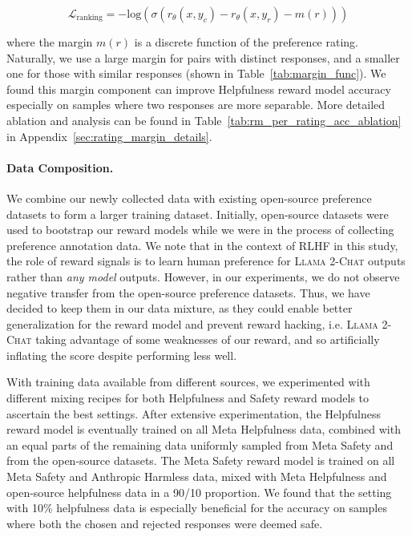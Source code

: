 \begin{equation}
\mathcal{L}_{\text{ranking}} = -\text{log}(\sigma(r_\theta(x,y_{c}) - r_\theta(x,y_{r}) - m(r)))
\label{eq:rating_loss}
\end{equation}

where the margin $m(r)$ is a discrete function of the preference rating.  Naturally, we use a large margin for pairs with distinct responses, and a smaller one for those with similar responses (shown in Table~\ref{tab:margin_func}).
We found this margin component can improve Helpfulness reward model accuracy especially on samples where two responses are more separable. More detailed ablation and analysis can be found in Table~\ref{tab:rm_per_rating_acc_ablation} in Appendix~\ref{sec:rating_margin_details}.

\paragraph{Data Composition.} We combine our newly collected data with existing open-source preference datasets to form a larger training dataset. Initially, open-source datasets were used to bootstrap our reward models while we were in the process of collecting preference annotation data. We note that in the context of RLHF in this study, the role of reward signals is to learn human preference for \textsc{Llama 2-Chat} outputs rather than \emph{any model} outputs. However, in our experiments, we do not observe negative transfer from the open-source preference datasets. Thus, we have decided to keep them in our data mixture, as they could enable better generalization for the reward model and prevent reward hacking, i.e. \textsc{Llama 2-Chat} taking advantage of some weaknesses of our reward, and so artificially inflating the score despite performing less well. 

With training data available from different sources, we experimented with different mixing recipes for both Helpfulness and Safety reward models to ascertain the best settings. After extensive experimentation, the Helpfulness reward model is eventually trained on all Meta Helpfulness data, combined with an equal parts of the remaining data uniformly sampled from Meta Safety and from the open-source datasets. The Meta Safety reward model is trained on all Meta Safety and Anthropic Harmless data, mixed with Meta Helpfulness and open-source helpfulness data in a 90/10 proportion. We found that the setting with 10\% helpfulness data is especially beneficial for the accuracy on samples where both the chosen and rejected responses were deemed safe.

